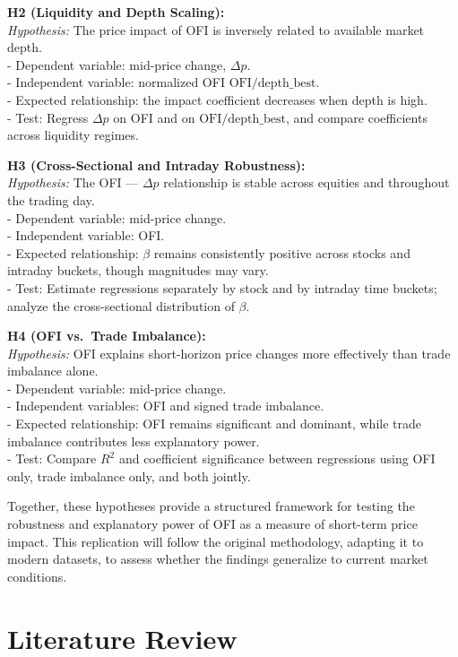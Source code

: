 \documentclass{article}
\begin{document}
\textbf{H2 (Liquidity and Depth Scaling):}\\
\emph{Hypothesis:} The price impact of OFI is inversely related to
available market depth.\\
- Dependent variable: mid-price change, \(\Delta p\).\\
- Independent variable: normalized OFI
\(\text{OFI} / \text{depth\_best}\).\\
- Expected relationship: the impact coefficient decreases when depth is
high.\\
- Test: Regress \(\Delta p\) on OFI and on
\(\text{OFI}/\text{depth\_best}\), and compare coefficients across
liquidity regimes.

\textbf{H3 (Cross-Sectional and Intraday Robustness):}\\
\emph{Hypothesis:} The OFI --- \(\Delta p\) relationship is stable
across equities and throughout the trading day.\\
- Dependent variable: mid-price change.\\
- Independent variable: OFI.\\
- Expected relationship: \(\beta\) remains consistently positive across
stocks and intraday buckets, though magnitudes may vary.\\
- Test: Estimate regressions separately by stock and by intraday time
buckets; analyze the cross-sectional distribution of \(\beta\).

\textbf{H4 (OFI vs.~Trade Imbalance):}\\
\emph{Hypothesis:} OFI explains short-horizon price changes more
effectively than trade imbalance alone.\\
- Dependent variable: mid-price change.\\
- Independent variables: OFI and signed trade imbalance.\\
- Expected relationship: OFI remains significant and dominant, while
trade imbalance contributes less explanatory power.\\
- Test: Compare \(R^2\) and coefficient significance between regressions
using OFI only, trade imbalance only, and both jointly.

Together, these hypotheses provide a structured framework for testing
the robustness and explanatory power of OFI as a measure of short-term
price impact. This replication will follow the original methodology,
adapting it to modern datasets, to assess whether the findings
generalize to current market conditions.

\section{Literature Review}\label{literature-review}
\end{document}
